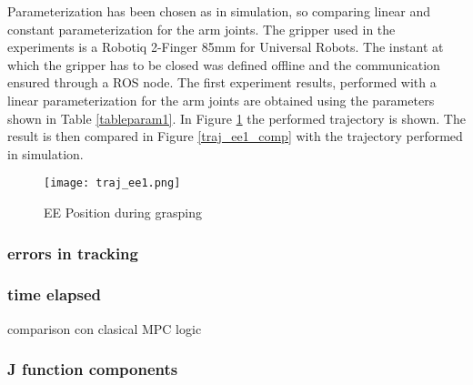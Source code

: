 	Parameterization has been chosen as in simulation, so comparing linear and constant parameterization for the arm joints. The gripper used in the experiments is a Robotiq 2-Finger 85mm for Universal Robots. The instant at which the gripper has to be closed was defined offline and the communication ensured through a ROS node. The first experiment results, performed with a linear parameterization for the arm joints are obtained using the parameters shown in Table \ref{tableparam1}. 
	In Figure \ref{traj_ee1} the performed trajectory is shown. The result is then compared in Figure \ref{traj_ee1_comp} with the trajectory performed in simulation. 

	\begin{figure}[h!]
	\centering
	\texttt{[image: traj\_ee1.png]}
	\caption{EE Position during grasping}
	\label{traj_ee1}
	\end{figure}
		\subsubsection{errors in tracking}
			
		\subsubsection{time elapsed}
			comparison con clasical MPC logic
		\subsubsection{J function components}
